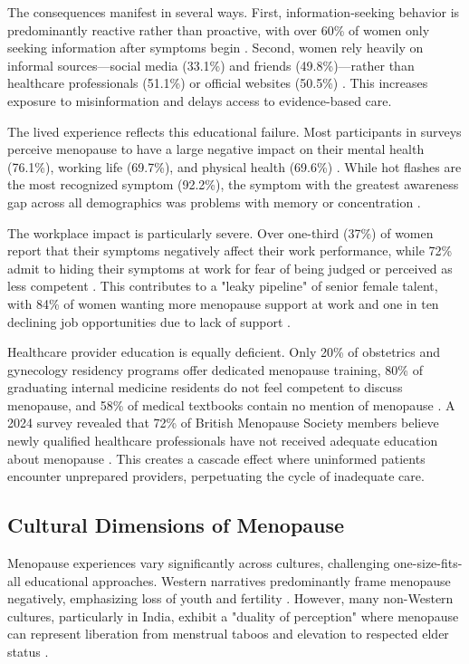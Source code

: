 \documentclass[letterpaper]{article} %
\begin{document}
The consequences manifest in several ways. First, information-seeking behavior is predominantly reactive rather than proactive, with over 60\% of women only seeking information after symptoms begin \cite{ucl2023menopause}. Second, women rely heavily on informal sources—social media (33.1\%) and friends (49.8\%)—rather than healthcare professionals (51.1\%) or official websites (50.5\%) \cite{bonafide2023state}. This increases exposure to misinformation and delays access to evidence-based care.

The lived experience reflects this educational failure. Most participants in surveys perceive menopause to have a large negative impact on their mental health (76.1\%), working life (69.7\%), and physical health (69.6\%) \cite{mdpi2025knowledge}. While hot flashes are the most recognized symptom (92.2\%), the symptom with the greatest awareness gap across all demographics was problems with memory or concentration \cite{mdpi2025knowledge}.

The workplace impact is particularly severe. Over one-third (37\%) of women report that their symptoms negatively affect their work performance, while 72\% admit to hiding their symptoms at work for fear of being judged or perceived as less competent \cite{catalyst2024workplace}. This contributes to a "leaky pipeline" of senior female talent, with 84\% of women wanting more menopause support at work and one in ten declining job opportunities due to lack of support \cite{catalyst2024workplace}.

Healthcare provider education is equally deficient. Only 20\% of obstetrics and gynecology residency programs offer dedicated menopause training, 80\% of graduating internal medicine residents do not feel competent to discuss menopause, and 58\% of medical textbooks contain no mention of menopause \cite{crmc2023knowledge}. A 2024 survey revealed that 72\% of British Menopause Society members believe newly qualified healthcare professionals have not received adequate education about menopause \cite{impactsofmenopause2023}. This creates a cascade effect where uninformed patients encounter unprepared providers, perpetuating the cycle of inadequate care.

\subsection{Cultural Dimensions of Menopause}

Menopause experiences vary significantly across cultures, challenging one-size-fits-all educational approaches. Western narratives predominantly frame menopause negatively, emphasizing loss of youth and fertility \cite{nabtahealth2023culture}. However, many non-Western cultures, particularly in India, exhibit a "duality of perception" where menopause can represent liberation from menstrual taboos and elevation to respected elder status \cite{bmjgh2023menopause}.
\end{document}
